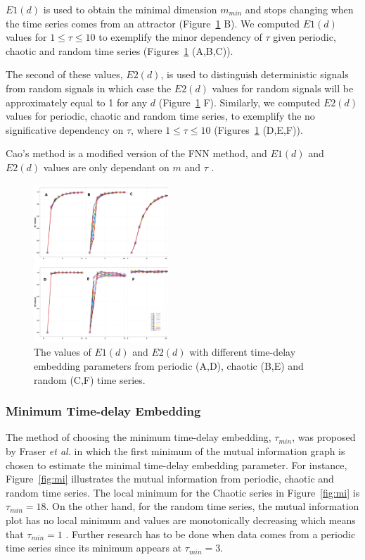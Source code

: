 \documentclass[10pt,journal,compsoc]{IEEEtran}
\begin{document}
$E1(d)$ is used to obtain the minimal dimension $m_{min}$ 
and stops changing when the time series comes from an 
attractor (Figure~\ref{fig:e1e2} B). We computed $E1(d)$ values for 
$1 \leq \tau \leq 10$ to exemplify the minor dependency of $\tau$ 
given periodic, chaotic and random time series (Figures~\ref{fig:e1e2} (A,B,C)).

The second of these values, $E2(d)$, is used to distinguish 
deterministic signals from random signals in which case 
the $E2(d)$ values for random signals will be approximately equal to 1 for 
any $d$ (Figure~\ref{fig:e1e2} F).
Similarly, we computed $E2(d)$ values 
for periodic, chaotic and random time series, to exemplify 
the no significative dependency on $\tau$, where $1 \leq \tau \leq 10$ 
(Figures~\ref{fig:e1e2} (D,E,F)).

Cao's method is a modified version of the FNN method, 
and $E1(d)$ and $E2(d)$ values are only dependant on $m$ and 
$\tau$ \cite{Cao1997}.
\begin{figure}[!htb]
\centering    
 \includegraphics[width=0.45\textwidth]{e1e2_v00}
\caption[PA]{The values of $E1(d)$ and $E2(d)$ with different time-delay 
embedding parameters from periodic (A,D), chaotic (B,E) and random (C,F) 
time series.}
\label{fig:e1e2}
\end{figure}

\subsubsection{Minimum Time-delay Embedding}
The method of choosing the minimum time-delay embedding, 
$\tau_{min}$, was proposed by Fraser \textit{et al.} \cite{Fraser1986} in which 
the first minimum of the mutual information graph is chosen 
to estimate the minimal time-delay embedding parameter. For 
instance, Figure~\ref{fig:mi}  illustrates the mutual information from 
periodic, chaotic and random time series.
The local minimum for the Chaotic series in Figure~\ref{fig:mi} is $\tau_{min} = 18$.
On the other hand, for the random time series, the mutual information plot has
no local minimum and values are monotonically decreasing which means that $\tau_{min} = 1$
\cite{Fraser1986}. Further research has to be done when
data comes from a periodic time series since its minimum appears at  $\tau_{min} = 3$.
\end{document}
